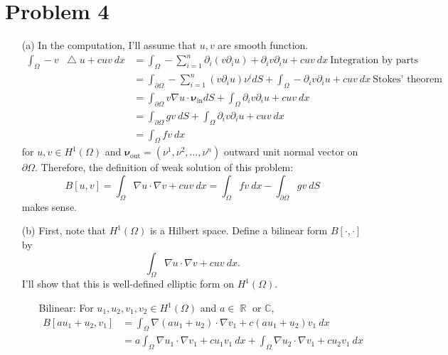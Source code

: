 \documentclass{article}
\DeclareMathOperator{\rr}{\mathbb{R}}
\newcommand*\Laplace{\mathop{}\!\mathbin\bigtriangleup}
\begin{document}
\section*{Problem 4}
\begin{enumerate}
\item[(a)] In the computation, I'll assume that $u,v$ are smooth function.
\begin{equation*}
\begin{split}
\int_\Omega -v\Laplace u+cuv~dx&=\int_\Omega -\sum\limits_{i=1}^n \partial_i (v\partial_i u)+\partial_i v \partial_i u+cuv~dx~\text{Integration by parts} \\
&=\int_{\partial \Omega} -\sum\limits_{i=1}^n \left(v\partial_i u\right)\nu^i dS+\int_\Omega -\partial_i v \partial_i u+cuv~dx~\text{Stokes' theorem} \\
&=\int_{\partial \Omega} v\nabla u \cdot \bm{\nu}_{\text{in}}dS+\int_\Omega \partial_i v \partial_i u+cuv~dx \\
&=\int_{\partial \Omega} gv~dS+\int_\Omega \partial_i v \partial_i u+cuv~dx \\
&=\int_\Omega fv~dx
\end{split}
\end{equation*}
for $u,v\in H^1(\Omega)$ and $\bm{\nu}_{\text{out}}=(\nu^1,\nu^2, \ldots, \nu^n)$ outward unit normal vector on $\partial \Omega$. Therefore, the definition of weak solution of this problem:
\begin{equation*}
B[u,v]=\int_\Omega \nabla u\cdot \nabla v + cuv~dx=\int_\Omega fv~dx-\int_{\partial \Omega} gv~dS
\end{equation*}
makes sense.
\item[(b)] First, note that $H^1(\Omega)$ is a Hilbert space. Define a bilinear form $B[\cdot,\cdot]$ by
\begin{equation*}
\int_\Omega \nabla u \cdot\nabla v + cuv~dx.
\end{equation*}
I'll show that this is well-defined elliptic form on $H^1(\Omega)$.
\begin{enumerate}
\item[Bilinear:] For $u_1,u_2,v_1, v_2\in H^1(\Omega)$ and $a\in \rr$ or $\mathbb{C}$,
\begin{equation*}
\begin{split}
B[au_1+u_2,v_1]&=\int_\Omega \nabla (au_1+u_2)\cdot \nabla v_1 + c(au_1+u_2)v_1~dx\\
&=a\int_\Omega \nabla u_1\cdot\nabla v_1 + c u_1v_1~dx+\int_\Omega \nabla u_2 \cdot\nabla v_1 + cu_2v_1~dx\\

\end{split}
\end{equation*}
\end{enumerate}
\end{enumerate}
\end{document}
